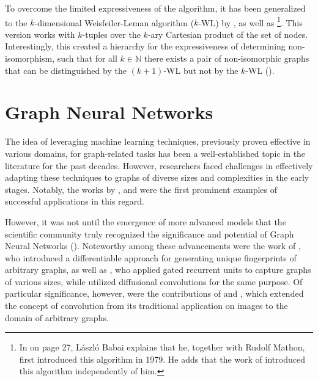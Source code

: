 To overcome the limited expressiveness of the \wl algorithm, it has been generalized to the $k$-dimensional Weisfeiler-Leman algorithm ($k$-WL) by \cite{Bab1979, Babai2016}, as well as \cite{Imm+1990}\footnote{In \cite{Babai2016} on page 27, László Babai explains that he, together with Rudolf Mathon, first introduced this algorithm in 1979. He adds that the work of \cite{Imm+1990} introduced this algorithm independently of him.}. This version works with $k$-tuples over the $k$-ary Cartesian product of the set of nodes. Interestingly, this created a hierarchy for the expressiveness of determining non-isomorphism, such that for all $k \in \mathbb{N}$ there exists a pair of non-isomorphic graphs that can be distinguished by the \textsf{$(k+1)$-WL} but not by the \textsf{$k$-WL} (\cite{Cai1992}).

\section{Graph Neural Networks}\label{sec:related_work_gnn}
The idea of leveraging machine learning techniques, previously proven effective in various domains, for graph-related tasks has been a well-established topic in the literature for the past decades. However, researchers faced challenges in effectively adapting these techniques to graphs of diverse sizes and complexities in the early stages. Notably, the works by \cite{Sperduti1997,Scarselli2008}, and \cite{Micheli2009} were the first prominent examples of successful applications in this regard.

However, it was not until the emergence of more advanced models that the scientific community truly recognized the significance and potential of \textsf{Graph Neural Networks} (\gnns). Noteworthy among these advancements were the work of \cite{Duvenaud2015}, who introduced a differentiable approach for generating unique fingerprints of arbitrary graphs, as well as \cite{Li2015}, who applied gated recurrent units to capture graphs of various sizes, while \cite{Atwood2016} utilized diffusional convolutions for the same purpose. Of particular significance, however, were the contributions of \cite{Bruna2013,Defferrard2016} and \cite{Kip+2017}, which extended the concept of convolution from its traditional application on images to the domain of arbitrary graphs.

